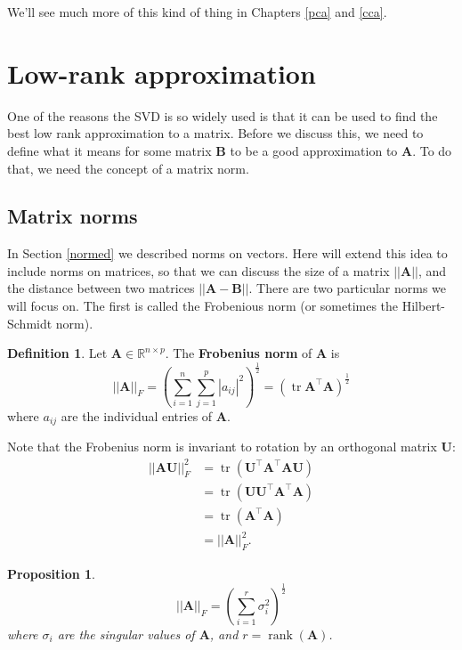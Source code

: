 \documentclass[]{book}
\newtheorem{proposition}{Proposition}[chapter]
\theoremstyle{definition}
\newtheorem{definition}{Definition}[chapter]
\theoremstyle{definition}
\theoremstyle{definition}
\theoremstyle{remark}
\begin{document}
We'll see much more of this kind of thing in Chapters \ref{pca} and \ref{cca}.

\hypertarget{low-rank-approximation}{%
\section{Low-rank approximation}\label{low-rank-approximation}}

One of the reasons the SVD is so widely used is that it can be used to find the best low rank approximation to a matrix. Before we discuss this, we need to define what it means for some matrix \(\mathbf B\) to be a good approximation to \(\mathbf A\). To do that, we need the concept of a matrix norm.

\hypertarget{matrix-norms}{%
\subsection{Matrix norms}\label{matrix-norms}}

In Section \ref{normed} we described norms on vectors. Here will extend this idea to include norms on matrices, so that we can discuss the size of a matrix \(||\mathbf A||\), and the distance between two matrices \(||\mathbf A-\mathbf B||\). There are two particular norms we will focus on. The first is called the Frobenious norm (or sometimes the Hilbert-Schmidt norm).

\begin{definition}
\protect\hypertarget{def:frobenius}{}{\label{def:frobenius} }Let \(\mathbf A\in \mathbb{R}^{n\times p}\). The \textbf{Frobenius norm} of \(\mathbf A\) is
\[||\mathbf A||_F = \left(\sum_{i=1}^n\sum_{j=1}^p |a_{ij}|^2\right)^{\frac{1}{2}}=(\operatorname{tr}\mathbf A^\top\mathbf A)^{\frac{1}{2}}  
\]
where \(a_{ij}\) are the individual entries of \(\mathbf A\).
\end{definition}

Note that the Frobenius norm is invariant to rotation by an orthogonal matrix \(\mathbf U\):
\begin{align*}
 ||\mathbf A\mathbf U||_F^2 &= \operatorname{tr}(\mathbf U^\top \mathbf A^\top \mathbf A\mathbf U)\\
 &=\operatorname{tr}(\mathbf U\mathbf U^\top \mathbf A^\top \mathbf A)\\
 &= \operatorname{tr}(\mathbf A^\top\mathbf A)\\
 &= ||\mathbf A||_F^2.
\end{align*}

\begin{proposition}
\protect\hypertarget{prp:frob}{}{\label{prp:frob} }\[||\mathbf A||_F = \left(\sum_{i=1}^r \sigma_i^2\right)^{\frac{1}{2}}\]
where \(\sigma_i\) are the singular values of \(\mathbf A\), and \(r = \operatorname{rank}(\mathbf A)\).
\end{proposition}
\end{document}
